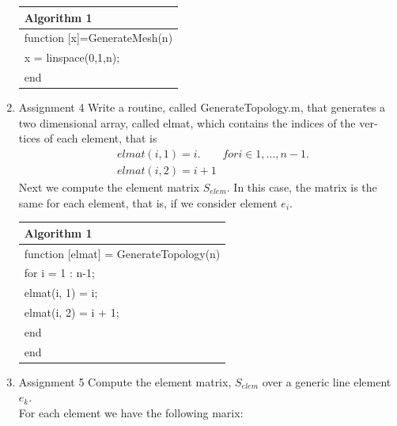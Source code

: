 \documentclass[a4paper,10pt]{report}
\begin{document}
\begin{enumerate}
\begin{table}[!h]\centering

\begin{tabular}{ |l| } 
\hline
\textbf{Algorithm 1}\\
\hline
\hspace{0.5cm}function [x]=GenerateMesh(n)\\
\hspace{1cm}x = linspace(0,1,n);\\
\hspace{0.5cm}end\\
\hline
\end{tabular}
\end{table}

\item{Assignment 4} Write a routine, called GenerateTopology.m, that generates
a two dimensional array, called elmat, which contains the indices of the ver-
tices of each element, that is
\begin{align*}
&elmat(i, 1) = i. \qquad for i ∈ {1, . . . , n − 1}.\\
&elmat(i, 2) = i + 1
\end{align*}
Next we compute the element matrix $S_{elem}$. In this case, the matrix is the
same for each element, that is, if we consider element $e_i$.

\begin{table}[!h]
\centering
\begin{tabular}{ |l| } 
\hline
\textbf{Algorithm 1}\\
\hline
\hspace{0.5cm}function [elmat] = GenerateTopology(n)\\
\hspace{0.5cm}for i = 1 : n-1;\\
\hspace{1cm}elmat(i, 1) = i;\\
\hspace{1cm}elmat(i, 2) = i + 1;\\
\hspace{0.5cm}end\\
\hspace{0.5cm}end\\
\hline
\end{tabular}
\end{table}


\item{Assignment 5} Compute the element matrix, $S_{elem}$ over a generic line element $e_k$.\\
For each element we have the following marix:


\end{enumerate}
\end{document}
